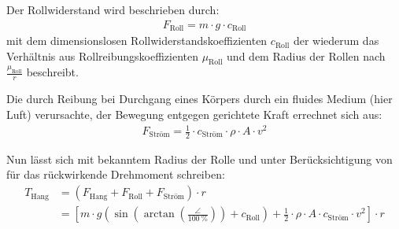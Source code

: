 	Der Rollwiderstand wird beschrieben durch:
	\begin{align}
		F_\text{Roll} = m \cdot g \cdot c_\text{Roll}
		\label{eq:rolling resistance}
	\end{align}
	mit dem dimensionslosen Rollwiderstandskoeffizienten \(c_\text{Roll}\) der wiederum das Verhältnis aus Rollreibungskoeffizienten \(\mu_\text{Roll}\) und dem Radius der Rollen nach \(\frac{\mu_\text{Roll}}{r}\) beschreibt.\par\medskip
	Die durch Reibung bei Durchgang eines Körpers durch ein fluides Medium (hier Luft) verursachte, der Bewegung entgegen gerichtete Kraft errechnet sich aus:
	\begin{align}
		F_\text{Ström} = \frac{1}{2} \cdot c_\text{Ström} \cdot \rho \cdot A \cdot v^2
		\label{eq:air drag}
	\end{align}

	Nun lässt sich mit bekanntem Radius der Rolle und unter Berücksichtigung von  für das rückwirkende Drehmoment schreiben:
	\begin{align}
		T_\text{Hang}	&= \left(F_\text{Hang} + F_\text{Roll} + F_\text{Ström}\right) \cdot r \nonumber \\
						&= \left[ m \cdot g \left( \sin\left(\arctan\left(\frac{\angle}{\qty{100}{\percent}}\right)\right) + c_\text{Roll} \right) + \frac{1}{2} \cdot \rho \cdot A \cdot c_\text{Ström} \cdot v^2 \right] \cdot r%
		\label{eq:incline plus roll plus drag torque}
	\end{align}

